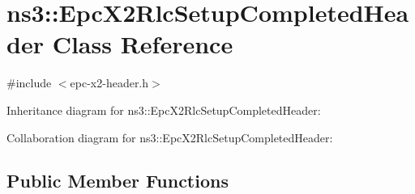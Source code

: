 \hypertarget{classns3_1_1EpcX2RlcSetupCompletedHeader}{}\section{ns3\+:\+:Epc\+X2\+Rlc\+Setup\+Completed\+Header Class Reference}
\label{classns3_1_1EpcX2RlcSetupCompletedHeader}


{\ttfamily \#include $<$epc-\/x2-\/header.\+h$>$}



Inheritance diagram for ns3\+:\+:Epc\+X2\+Rlc\+Setup\+Completed\+Header\+:


Collaboration diagram for ns3\+:\+:Epc\+X2\+Rlc\+Setup\+Completed\+Header\+:
\subsection*{Public Member Functions}
